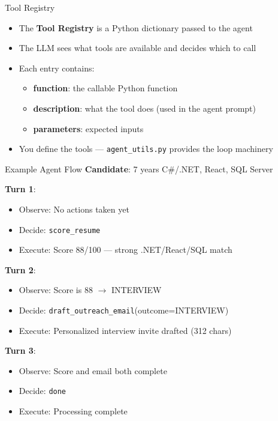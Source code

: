 \documentclass[aspectratio=169]{beamer}
\begin{document}
\begin{frame}{Tool Registry}
\begin{itemize}
	\item The \textbf{Tool Registry} is a Python dictionary passed to the agent
	\item The LLM sees what tools are available and decides which to call
	\item Each entry contains:

\begin{itemize}
    \item \textbf{function}: the callable Python function
    \item \textbf{description}: what the tool does (used in the agent prompt)
    \item \textbf{parameters}: expected inputs
\end{itemize}

    \vspace{0.2cm}
    \item You define the tools --- \texttt{agent\_utils.py} provides the loop machinery
\end{itemize}
\end{frame}

\begin{frame}{Example Agent Flow}
\textbf{Candidate}: 7 years C\#/.NET, React, SQL Server
\vspace{0.3cm}

\textbf{Turn 1}:
\begin{itemize}
    \item Observe: No actions taken yet
    \item Decide: \texttt{score\_resume}
    \item Execute: Score 88/100 --- strong .NET/React/SQL match
\end{itemize}

\textbf{Turn 2}:
\begin{itemize}
    \item Observe: Score is 88 $\rightarrow$ INTERVIEW
    \item Decide: \texttt{draft\_outreach\_email}(outcome=INTERVIEW)
    \item Execute: Personalized interview invite drafted (312 chars)
\end{itemize}

\textbf{Turn 3}:
\begin{itemize}
    \item Observe: Score and email both complete
    \item Decide: \texttt{done}
    \item Execute: Processing complete
\end{itemize}
\end{frame}
\end{document}
